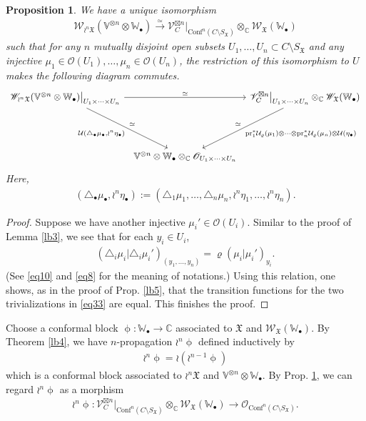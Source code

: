 \documentclass[12pt,a4paper,notitlepage]{article}
\theoremstyle{definition}
\theoremstyle{plain}
\newtheorem{pp}[df]{Proposition}
\newcommand{\fk}{\mathfrak}
\newcommand{\mc}{\mathcal}
\newcommand{\Conf}{\mathrm{Conf}}
\newcommand{\scr}{\mathscr}
\newcommand{\SX}{{S_{\fk X}}}
\newcommand{\blt}{\bullet}
\newcommand{\Vbb}{\mathbb V}
\newcommand{\Wbb}{\mathbb W}
\newcommand{\Cbb}{\mathbb C}
\newcommand{\pr}{\mathrm {pr}}
\numberwithin{equation}{section}
\begin{document}
\begin{pp}\label{lb16}
We have a unique isomorphism
\begin{align}
\scr W_{\wr^n\fk X}(\Vbb^{\otimes n}\otimes\Wbb_\blt)\xrightarrow{\simeq}\scr V_C^{\boxtimes n}\big|_{\Conf^n(C\setminus\SX)}\otimes_\Cbb \scr W_{\fk X}(\Wbb_\blt)	
\end{align}
such that for any $n$ mutually disjoint open subsets $U_1,\dots,U_n\subset C\setminus\SX$ and any injective $\mu_1\in\scr O(U_1),\dots,\mu_n\in\scr O(U_n)$, the restriction of this isomorphism to $U$ makes the following diagram commutes.
\begin{equation}
\begin{tikzcd}[column sep=tiny]
\scr W_{\wr^n\fk X}(\Vbb^{\otimes n}\otimes\Wbb_\blt)\big|_{U_1\times\cdots\times U_n} \arrow[rr,"\simeq"] \arrow[ddr, "\simeq" ,"{\mc U(\triangle_\blt\mu_\blt,\wr^n\eta_\blt)}"']  && \scr V_C^{\boxtimes n}\big|_{U_1\times\cdots\times U_n}\otimes_\Cbb\scr W_{\fk X}(\Wbb_\blt)	 \arrow[ddl,"\simeq"',"{\pr_1^*\mc U_\varrho(\mu_1)\otimes\cdots\otimes\pr_n^*\mc U_\varrho(\mu_n)\otimes \mc U(\eta_\blt)}"]\\
{}\\
& \Vbb^{\otimes n}\otimes\Wbb_\blt\otimes_\Cbb \scr O_{U_1\times\cdots\times U_n}
\end{tikzcd}\label{eq33}	
\end{equation}
Here,
\begin{gather*}
(\triangle_\blt\mu_\blt,\wr^n\eta_\blt):=(\triangle_1\mu_1,\dots,\triangle_n\mu_n,\wr^n\eta_1,\dots,\wr^n\eta_n).	
\end{gather*}
\end{pp}


\begin{proof}
Suppose we have another injective $\mu_i'\in\scr O(U_i)$. Similar to the proof of Lemma \ref{lb3}, we see that for each $y_i\in U_i$,
\begin{align*}
(\triangle_i\mu_i|\triangle_i\mu_i')_{(y_1,\dots,y_n)}=\varrho(\mu_i|\mu_i')_{y_i}.	
\end{align*}
(See  \eqref{eq10} and \eqref{eq8} for the meaning of notations.) Using this relation, one shows, as in the proof of Prop. \ref{lb5}, that the transition functions for the two trivializations in \eqref{eq33} are equal. This finishes the proof.
\end{proof}




Choose a conformal block $\upphi:\Wbb_\blt\rightarrow\Cbb$ associated to $\fk X$ and $\scr W_{\fk X}(\Wbb_\blt)$. By Theorem \ref{lb4}, we have $n$-propagation $\wr^n\upphi$ defined inductively by
\begin{align*}
\wr^n\upphi=\wr(\wr^{n-1}\upphi)
\end{align*}
which is a conformal block associated to $\wr^n\fk X$ and $\Vbb^{\otimes n}\otimes\Wbb_\blt$. By Prop. \ref{lb16}, we can regard $\wr^n\upphi$ as a morphism
\begin{align*}
\wr^n\upphi:\scr V_C^{\boxtimes n}\big|_{\Conf^n(C\setminus\SX)}\otimes_\Cbb\scr W_{\fk X}(\Wbb_\blt)	\rightarrow\scr O_{\Conf^n(C\setminus\SX)}.	
\end{align*}
\end{document}

